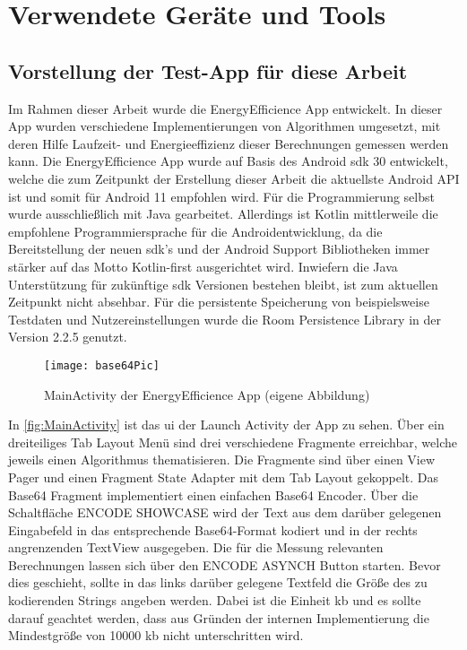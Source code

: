 \chapter{Verwendete Geräte und Tools}
\section{Vorstellung der Test-App für diese Arbeit}
Im Rahmen dieser Arbeit wurde die \glqq EnergyEfficience\grqq{} App entwickelt. In dieser App wurden verschiedene Implementierungen von Algorithmen umgesetzt, mit deren Hilfe Laufzeit- und Energieeffizienz dieser Berechnungen gemessen werden kann.
Die \glqq EnergyEfficience\grqq{} App wurde auf Basis des Android \ac{sdk} 30 entwickelt, welche die zum Zeitpunkt der Erstellung dieser Arbeit die aktuellste Android API ist und somit für Android 11 empfohlen wird. Für die Programmierung selbst wurde ausschließlich mit Java gearbeitet. Allerdings ist Kotlin mittlerweile die empfohlene Programmiersprache für die Androidentwicklung, da die Bereitstellung der neuen \ac{sdk}'s und der Android Support Bibliotheken immer stärker auf das Motto \glqq Kotlin-first\grqq{} \cite{kotlin-first} ausgerichtet wird. Inwiefern die Java Unterstützung für zukünftige \ac{sdk} Versionen bestehen bleibt, ist zum aktuellen Zeitpunkt nicht absehbar.
Für die persistente Speicherung von beispielsweise Testdaten und Nutzereinstellungen wurde die Room Persistence Library in der Version 2.2.5 genutzt.
\begin{figure}[H]
	\begin{center}	 
	\texttt{[image: base64Pic]}
	\caption{MainActivity der EnergyEfficience App (eigene Abbildung)}
	\label{fig:MainActivity} 
	\end{center}
\end{figure}
In \autoref{fig:MainActivity} ist das \ac{ui} der Launch Activity der App zu sehen. Über ein dreiteiliges Tab Layout Menü sind drei verschiedene Fragmente erreichbar, welche jeweils einen Algorithmus thematisieren. Die Fragmente sind über einen View Pager und einen Fragment State Adapter mit dem Tab Layout gekoppelt. Das Base64 Fragment implementiert einen einfachen Base64 Encoder. Über die Schaltfläche \glqq ENCODE SHOWCASE\grqq{} wird der Text aus dem darüber gelegenen Eingabefeld in das entsprechende Base64-Format kodiert und in der rechts angrenzenden TextView ausgegeben. Die für die Messung relevanten Berechnungen lassen sich über den \glqq ENCODE ASYNCH\grqq{} Button starten. Bevor dies geschieht, sollte in das links darüber gelegene Textfeld die Größe des zu kodierenden Strings angeben werden. Dabei ist die Einheit \ac{kb} und es sollte darauf geachtet werden, dass aus Gründen der internen Implementierung die Mindestgröße von 10000 \ac{kb} nicht unterschritten wird. 

